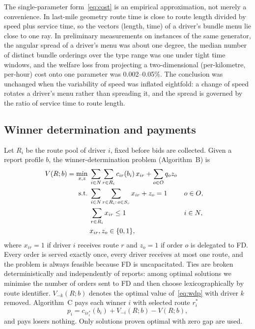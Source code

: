 \documentclass[review,12pt]{elsarticle}
\theoremstyle{definition}
\theoremstyle{remark}
\begin{document}
The single-parameter form~\eqref{eq:cost} is an empirical approximation,
not merely a convenience. In last-mile geometry route time is close to
route length divided by speed plus service time, so the vectors
(length, time) of a driver's bundle menu lie close to one ray. In
preliminary measurements on instances of the same generator, the angular
spread of a driver's menu was about one degree, the median number of
distinct bundle orderings over the type range was one under tight time
windows, and the welfare loss from projecting a two-dimensional
(per-kilometre, per-hour) cost onto one parameter was 0.002--0.05\%. The
conclusion was unchanged when the variability of speed was inflated
eightfold: a change of speed rotates a driver's menu rather than spreading
it, and the spread is governed by the ratio of service time to route
length.

\subsection{Winner determination and payments}

Let $R_i$ be the route pool of driver $i$, fixed before bids are
collected. Given a report profile $b$, the winner-determination problem
(Algorithm~B) is
\begin{align}
V(R;b)=\min_{x,z}\;&\sum_{i\in N}\sum_{r\in R_i}c_{ir}(b_i)\,x_{ir}+\sum_{o\in O}q_o z_o
\label{eq:wdp}\\
\text{s.t.}\;&\sum_{i\in N}\sum_{r\in R_i:\,o\in S_r}x_{ir}+z_o=1 && o\in O,\notag\\
&\sum_{r\in R_i}x_{ir}\le 1 && i\in N,\notag\\
&x_{ir},z_o\in\{0,1\},\notag
\end{align}
where $x_{ir}=1$ if driver $i$ receives route $r$ and $z_o=1$ if order $o$
is delegated to FD. Every order is served exactly once, every driver
receives at most one route, and the problem is always feasible because FD
is uncapacitated. Ties are broken deterministically and independently of
reports: among optimal solutions we minimise the number of orders sent to
FD and then choose lexicographically by route identifier. $V_{-k}(R;b)$
denotes the optimal value of~\eqref{eq:wdp} with driver $k$ removed.
Algorithm~C pays each winner $i$ with selected route $r_i^\ast$
\begin{equation}
p_i=c_{ir_i^\ast}(b_i)+V_{-i}(R;b)-V(R;b),
\label{eq:payment}
\end{equation}
and pays losers nothing. Only solutions proven optimal with zero gap are
used.
\end{document}

